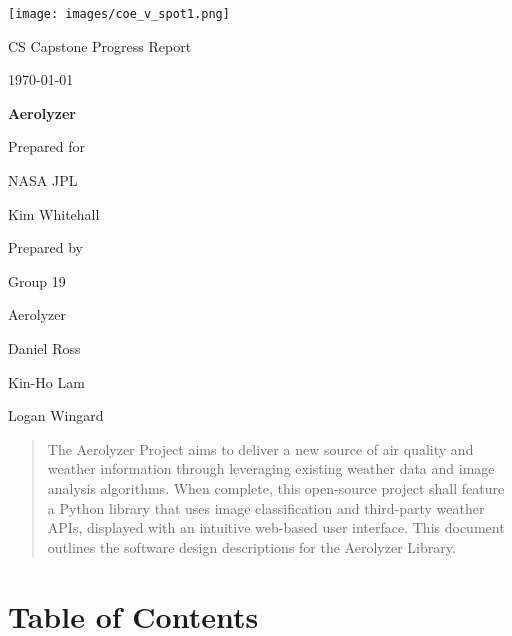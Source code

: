\documentclass[onecolumn, draftclsnofoot,10pt, compsoc]{IEEEtran}
\def \CapstoneTeamName{		Aerolyzer}
\def \CapstoneTeamNumber{		19}
\def \GroupMemberOne{			Daniel Ross}
\def \GroupMemberTwo{			Kin-Ho Lam}
\def \GroupMemberThree{			Logan Wingard}
\def \CapstoneProjectName{		Aerolyzer}
\def \CapstoneSponsorCompany{	NASA JPL}
\def \CapstoneSponsorPerson{		Kim Whitehall}
\def \DocType{		%
	Progress Report
}
\newcommand{\NameSigPair}[1]{\par
	\makebox[2.75in][r]{#1} \hfil 	\makebox[3.25in]{\makebox[2.25in]{\hrulefill} \hfill		\makebox[.75in]{\hrulefill}}
	\par\vspace{-12pt} \textit{\tiny\noindent
		\makebox[2.75in]{} \hfil		\makebox[3.25in]{\makebox[2.25in][r]{Signature} \hfill	\makebox[.75in][r]{Date}}}}
\renewcommand{\NameSigPair}[1]{#1}
\begin{document}
	\begin{titlepage}
		\begin{singlespace}
			\centering
			\texttt{[image: images/coe\_v\_spot1.png]}
			\hfill 
			\par\vspace{.2in}
			\centering
			\scshape{
				\huge CS Capstone \DocType \par
				{\large\today}\par
				\vspace{.5in}
				\textbf{\Huge\CapstoneProjectName}\par
				\vfill
				{\large Prepared for}\par
				\Huge \CapstoneSponsorCompany\par
				\vspace{5pt}
				{\Large\NameSigPair{\CapstoneSponsorPerson}\par}
				{\large Prepared by }\par
				Group\CapstoneTeamNumber\par
				\CapstoneTeamName\par 
				\vspace{5pt}
				{\large
					\NameSigPair{\GroupMemberOne}\par
					\NameSigPair{\GroupMemberTwo}\par
					\NameSigPair{\GroupMemberThree}\par
				}
				\vspace{20pt}
			}
			\begin{abstract}  
				The Aerolyzer Project aims to deliver a new source of air quality and weather information through leveraging existing weather data and image analysis algorithms.
				When complete, this open-source project shall feature a Python library that uses image classification and third-party weather APIs, displayed with an intuitive web-based user interface.
				This document outlines the software design descriptions for the Aerolyzer Library. 
			\end{abstract}     
		\end{singlespace}
	\end{titlepage}
\section{Table of Contents}
\tableofcontents


\clearpage
\end{document}

